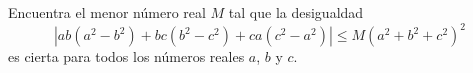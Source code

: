 Encuentra el menor número real $M$ tal que la desigualdad \[|ab(a^{2}-b^{2})+bc(b^{2}-c^{2})+ca(c^{2}-a^{2})| \leq M(a^{2}+b^{2}+c^{2})^{2}\] es cierta para todos los números reales $a$, $b$ y $c$.